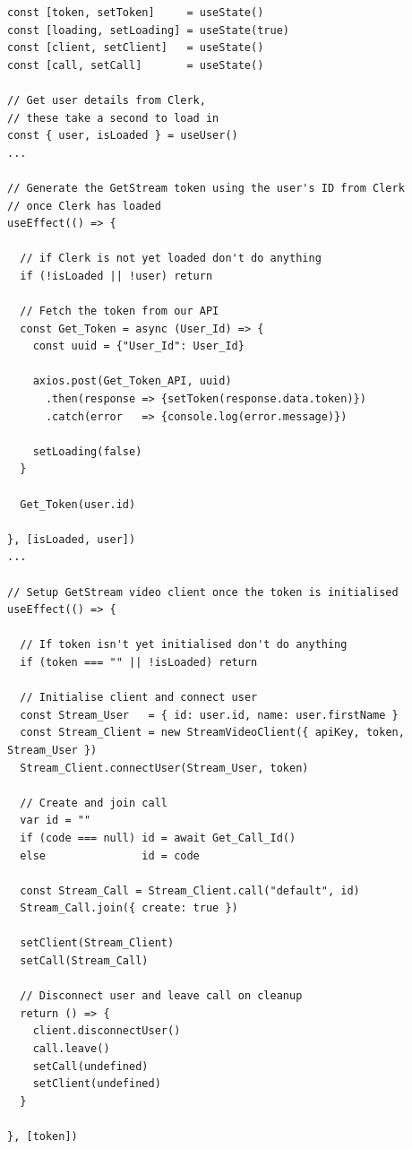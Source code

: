 \begin{verbatim}
const [token, setToken]     = useState()
const [loading, setLoading] = useState(true)
const [client, setClient]   = useState()
const [call, setCall]       = useState()

// Get user details from Clerk, 
// these take a second to load in 
const { user, isLoaded } = useUser()
...

// Generate the GetStream token using the user's ID from Clerk
// once Clerk has loaded
useEffect(() => {

  // if Clerk is not yet loaded don't do anything
  if (!isLoaded || !user) return
   
  // Fetch the token from our API
  const Get_Token = async (User_Id) => {
    const uuid = {"User_Id": User_Id}

    axios.post(Get_Token_API, uuid)
      .then(response => {setToken(response.data.token)})
      .catch(error   => {console.log(error.message)})
      
    setLoading(false)
  }

  Get_Token(user.id)

}, [isLoaded, user])
...

// Setup GetStream video client once the token is initialised
useEffect(() => {
	
  // If token isn't yet initialised don't do anything
  if (token === "" || !isLoaded) return

  // Initialise client and connect user
  const Stream_User   = { id: user.id, name: user.firstName }
  const Stream_Client = new StreamVideoClient({ apiKey, token, Stream_User })
  Stream_Client.connectUser(Stream_User, token)

  // Create and join call
  var id = ""
  if (code === null) id = await Get_Call_Id()
  else               id = code

  const Stream_Call = Stream_Client.call("default", id)
  Stream_Call.join({ create: true })

  setClient(Stream_Client)
  setCall(Stream_Call)

  // Disconnect user and leave call on cleanup
  return () => {
    client.disconnectUser()
    call.leave()
    setCall(undefined)
    setClient(undefined)
  }

}, [token])
\end{verbatim}

{\color{gray} \hrulefill} \\ \vspace{0.2cm}

